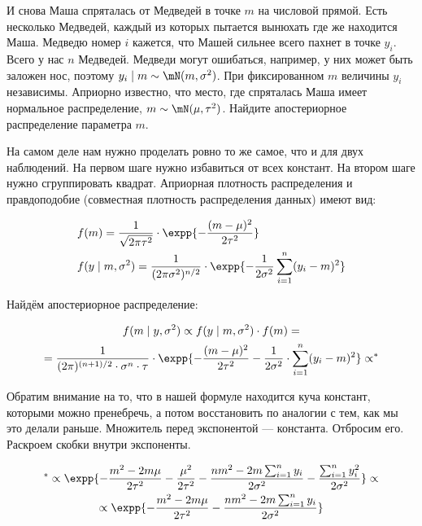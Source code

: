 \begin{problem}\label{norm_upr}
	
И снова Маша спряталась от Медведей в точке $m$ на числовой прямой. Есть несколько Медведей, каждый из которых пытается вынюхать где же находится Маша. Медведю номер $i$ кажется, что Машей сильнее всего пахнет в точке $y_i$. Всего у нас $n$ Медведей. Медведи могут ошибаться, например, у них может быть заложен нос, поэтому $y_i \mid m \sim \mN( m, \sigma^2)$. При фиксированном $m$ величины $y_i$ независимы. Априорно известно, что место, где спряталась Маша имеет нормальное распределение, $m \sim \mN(\mu, \tau^2)$. Найдите апостериорное распределение параметра $m$.
	
\begin{sol}

На самом деле нам нужно проделать ровно то же самое, что и для двух наблюдений. На первом шаге нужно избавиться от всех констант. На втором шаге нужно сгруппировать квадрат. Априорная плотность распределения и правдоподобие (совместная плотность распределения данных) имеют вид:

\begin{equation*}
\begin{aligned}
&f(m) = \frac{1}{\sqrt{2\pi \tau^2}} \cdot \expp{-\frac{(m - \mu)^2}{2\tau^2}} \\
&f(y \mid m, \sigma^2) = \frac{1}{(2 \pi \sigma^2)^{n/2}} \cdot \expp{-\frac{1}{2\sigma^2} \sum_{i=1}^n (y_i - m)^2}
\end{aligned}
\end{equation*}

Найдём апостериорное распределение:

\begin{multline*}
f(m \mid y, \sigma^2) \propto f(y \mid m, \sigma^2) \cdot f(m) = \\ = \frac{1}{(2\pi)^{(n+1)/2} \cdot \sigma^n \cdot \tau} \cdot \expp{-\frac{(m - \mu)^2}{2 \tau^2} - \frac{1}{2 \sigma^2} \cdot \sum_{i=1}^n (y_i - m)^2} \propto ^{*} 
\end{multline*}

Обратим внимание на то, что в нашей формуле находится куча констант, которыми можно пренебречь, а потом восстановить по аналогии с тем, как мы это делали раньше. Множитель перед экспонентой --- константа. Отбросим его. Раскроем скобки внутри экспоненты.

\begin{multline*}
^{*} \propto \expp{-\frac{m^2 - 2m \mu}{2 \tau^2} - \frac{\mu^2}{2\tau^2} - \frac{n m^2 - 2m \sum_{i=1}^n y_i}{2\sigma^2} - \frac{\sum_{i=1}^{n} y_i^2}{2\sigma^2}} \propto \\ \propto \expp{-\frac{m^2 - 2m \mu}{2 \tau^2} - \frac{n m^2 - 2m \sum_{i=1}^n y_i}{2\sigma^2} }
\end{multline*}


\end{sol}
\end{problem}
